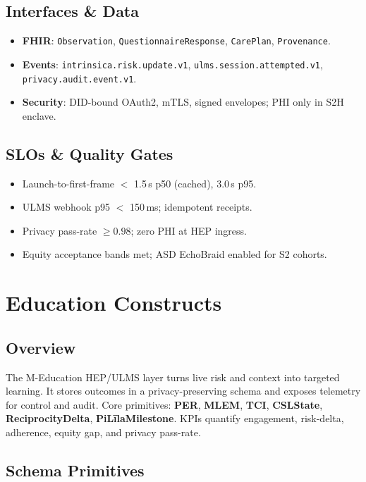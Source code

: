 \documentclass[11pt]{article}
\theoremstyle{plain}
\begin{document}
\subsection{Interfaces \& Data}
\begin{itemize}
  \item \textbf{FHIR}: \texttt{Observation}, \texttt{QuestionnaireResponse}, \texttt{CarePlan}, \texttt{Provenance}.
  \item \textbf{Events}: \texttt{intrinsica.risk.update.v1}, \texttt{ulms.session.attempted.v1}, \texttt{privacy.audit.event.v1}.
  \item \textbf{Security}: DID-bound OAuth2, mTLS, signed envelopes; PHI only in S2H enclave.
\end{itemize}

\subsection{SLOs \& Quality Gates}
\begin{itemize}
  \item Launch-to-first-frame $<$ 1.5\,s p50 (cached), 3.0\,s p95.
  \item ULMS webhook p95 $<$ 150\,ms; idempotent receipts.
  \item Privacy pass-rate $\ge 0.98$; zero PHI at HEP ingress.
  \item Equity acceptance bands met; ASD EchoBraid enabled for S2 cohorts.
\end{itemize}


\section{Education Constructs}

\subsection{Overview}
The M-Education HEP/ULMS layer turns live risk and context into targeted learning. It stores outcomes in a privacy-preserving schema and exposes telemetry for control and audit. Core primitives: \textbf{PER}, \textbf{MLEM}, \textbf{TCI}, \textbf{CSLState}, \textbf{ReciprocityDelta}, \textbf{PiLīlaMilestone}. KPIs quantify engagement, risk-delta, adherence, equity gap, and privacy pass-rate.

\subsection{Schema Primitives}
\end{document}
